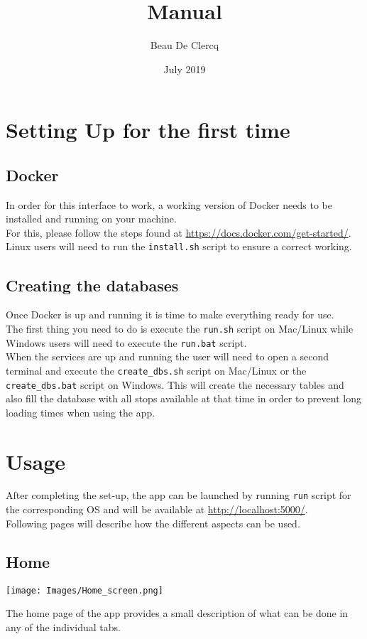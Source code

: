 \documentclass[12pt]{article}
\title{Manual}
\author{Beau De Clercq}
\date{July 2019}
\begin{document}
\maketitle{}

\tableofcontents

\clearpage
\newpage

\section{Setting Up for the first time}
\subsection{Docker}
\lstset{language=json}
In order for this interface to work, a working version of Docker needs to be installed and running on your machine.\\
For this, please follow the steps found at \url{https://docs.docker.com/get-started/}.\\
Linux users will need to run the \texttt{install.sh} script to ensure a correct working.

\subsection{Creating the databases}
Once Docker is up and running it is time to make everything ready for use.\\
The first thing you need to do is execute the \texttt{run.sh} script on Mac/Linux while Windows users will need to execute the \texttt{run.bat} script.\\
When the services are up and running the user will need to open a second terminal and execute the \texttt{create\_dbs.sh} script on Mac/Linux or the \texttt{create\_dbs.bat} script on Windows. This  will create the necessary tables and also fill the database with all stops available at that time in order to prevent long loading times when using the app.
\newpage

\section{Usage}
After completing the set-up, the app can be launched by running \texttt{run} script for the corresponding OS and will be available at \url{http://localhost:5000/}.\\
Following pages will describe how the different aspects can be used.
\newpage
\subsection{Home}
\begin{center}
	\texttt{[image: Images/Home\_screen.png]}
\end{center}
The home page of the app provides a small description of what can be done in any of the individual tabs.
\end{document}
